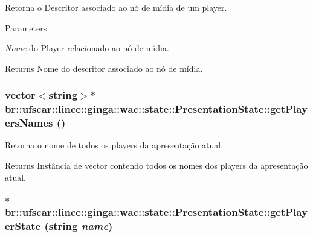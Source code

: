 Retorna o Descritor associado ao nó de mídia de um player. 
\begin{DoxyParams}{Parameters}
\item[{\em Nome}]do Player relacionado ao nó de mídia. \end{DoxyParams}
\begin{DoxyReturn}{Returns}
Nome do descritor associado ao nó de mídia. 
\end{DoxyReturn}
\hypertarget{classbr_1_1ufscar_1_1lince_1_1ginga_1_1wac_1_1state_1_1PresentationState_ad1d032b0daa21d879958a0bdfa3ab50e}{
\subsubsection[{getPlayersNames}]{\setlength{\rightskip}{0pt plus 5cm}vector$<$string$>$$\ast$ br::ufscar::lince::ginga::wac::state::PresentationState::getPlayersNames ()}}
\label{classbr_1_1ufscar_1_1lince_1_1ginga_1_1wac_1_1state_1_1PresentationState_ad1d032b0daa21d879958a0bdfa3ab50e}


Retorna o nome de todos os players da apresentação atual. \begin{DoxyReturn}{Returns}
Instância de vector contendo todos os nomes dos players da apresentação atual. 
\end{DoxyReturn}
\hypertarget{classbr_1_1ufscar_1_1lince_1_1ginga_1_1wac_1_1state_1_1PresentationState_aec08164fc9e175efb9e9b1658fbefafb}{
\subsubsection[{getPlayerState}]{$\ast$ br::ufscar::lince::ginga::wac::state::PresentationState::getPlayerState (string {\em name})}}
\label{classbr_1_1ufscar_1_1lince_1_1ginga_1_1wac_1_1state_1_1PresentationState_aec08164fc9e175efb9e9b1658fbefafb}


